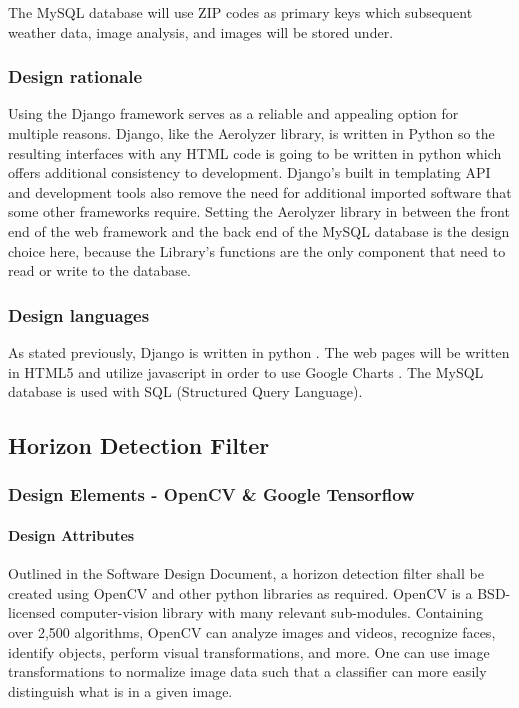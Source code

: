 \documentclass[onecolumn, draftclsnofoot,10pt, compsoc]{IEEEtran}
\begin{document}
\begin{singlespace}
			The MySQL database will use ZIP codes as primary keys which subsequent weather data, image analysis, and images will be stored under.
      
      \subsubsection{Design rationale}
		Using the Django framework serves as a reliable and appealing option for multiple reasons. Django, like the Aerolyzer library, is written in Python so the resulting interfaces with any HTML code is going to be written in python which offers additional consistency to development. Django’s built in templating API and development tools also remove the need for additional imported software that some other frameworks require.\cite{DjangoStart}\cite{DjangoOver}
			Setting the Aerolyzer library in between the front end of the web framework and the back end of the MySQL database is the design choice here, because the Library’s functions are the only component that need to read or write to the database.
     
      \subsubsection{Design languages}
		As stated previously, Django is written in python \cite{DjangoOver}. The web pages will be written in HTML5 and utilize javascript in order to use Google Charts \cite{GoogleCh}. The MySQL database is used with SQL (Structured Query Language).

	\subsection{Horizon Detection Filter}
      \subsubsection{Design Elements - OpenCV \& Google Tensorflow}
      		\paragraph{Design Attributes}
          		Outlined in the Software Design Document, a horizon detection filter shall be created using OpenCV and other python libraries as required. OpenCV is a BSD-licensed computer-vision library with many relevant sub-modules. Containing over 2,500 algorithms, OpenCV can analyze images and videos, recognize faces, identify objects, perform visual transformations, and more. One can use image transformations to normalize image data such that a classifier can more easily distinguish what is in a given image. \cite{svm}


\end{singlespace}
\end{document}
